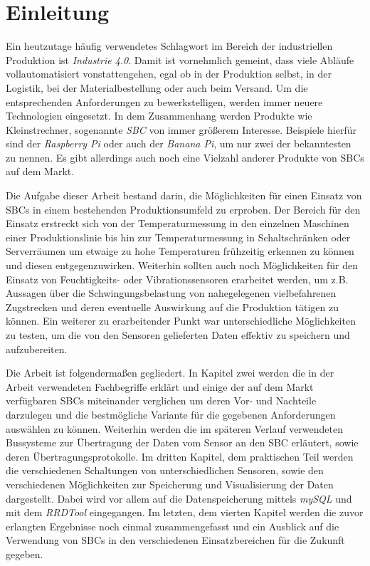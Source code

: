 \chapter{Einleitung}

Ein heutzutage häufig verwendetes Schlagwort im Bereich der industriellen Produktion ist \textit{Industrie 4.0}. Damit ist vornehmlich gemeint, dass viele Abläufe vollautomatisiert vonstattengehen, egal ob in der Produktion selbst, in der Logistik, bei der Materialbestellung oder auch beim Versand. Um die entsprechenden Anforderungen zu bewerkstelligen, werden immer neuere Technologien eingesetzt. In dem Zusammenhang werden Produkte wie Kleinstrechner, sogenannte \textit{\ac{SBC}} von immer größerem Interesse. Beispiele hierfür sind der \textit{\glqq Raspberry Pi\grqq} oder auch der \textit{\glqq Banana Pi\grqq}, um nur zwei der bekanntesten zu nennen. Es gibt allerdings auch noch eine Vielzahl anderer Produkte von \acp{SBC} auf dem Markt.

Die Aufgabe dieser Arbeit bestand darin, die Möglichkeiten für einen Einsatz von \acp{SBC} in einem bestehenden Produktionsumfeld zu erproben. Der Bereich für den Einsatz erstreckt sich von der Temperaturmessung in den einzelnen Maschinen einer Produktionslinie bis hin zur Temperaturmessung in Schaltschränken oder Serverräumen um etwaige zu hohe Temperaturen frühzeitig erkennen zu können und diesen entgegenzuwirken. Weiterhin sollten auch noch Möglichkeiten für den Einsatz von Feuchtigkeits- oder Vibrationssensoren erarbeitet werden, um z.B. Aussagen über die Schwingungsbelastung von nahegelegenen vielbefahrenen Zugstrecken und deren eventuelle Auswirkung auf die Produktion tätigen zu können. Ein weiterer zu erarbeitender Punkt war unterschiedliche Möglichkeiten zu testen, um die von den Sensoren gelieferten Daten effektiv zu speichern und aufzubereiten.

Die Arbeit ist folgendermaßen gegliedert. In Kapitel zwei werden die in der Arbeit verwendeten Fachbegriffe erklärt und einige der auf dem Markt verfügbaren \acp{SBC} miteinander verglichen um deren Vor- und Nachteile darzulegen und die bestmögliche Variante für die gegebenen Anforderungen auswählen zu können. Weiterhin werden die im späteren Verlauf verwendeten Bussysteme zur Übertragung der Daten vom Sensor an den \acl{SBC} erläutert, sowie deren Übertragungsprotokolle. Im dritten Kapitel, dem praktischen Teil werden die verschiedenen Schaltungen von unterschiedlichen Sensoren, sowie den verschiedenen Möglichkeiten zur Speicherung und Visualisierung der Daten dargestellt. Dabei wird vor allem auf die Datenspeicherung mittels \textit{mySQL} und mit dem \textit{RRDTool} eingegangen. Im letzten, dem vierten Kapitel werden die zuvor erlangten Ergebnisse noch einmal zusammengefasst und ein Ausblick auf die Verwendung von \acp{SBC} in den verschiedenen Einsatzbereichen für die Zukunft gegeben.